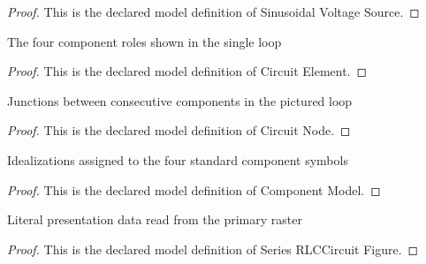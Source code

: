 \begin{proof}
  This is the declared model definition of Sinusoidal Voltage Source.
\end{proof}
\begin{definition}
  \label{def:physics:phyx-mini-0889:phyxminiproblems-problemphyxmini0889-circuitelement}
  The four component roles shown in the single loop
\end{definition}
\begin{proof}
  This is the declared model definition of Circuit Element.
\end{proof}
\begin{definition}
  \label{def:physics:phyx-mini-0889:phyxminiproblems-problemphyxmini0889-circuitnode}
  Junctions between consecutive components in the pictured loop
\end{definition}
\begin{proof}
  This is the declared model definition of Circuit Node.
\end{proof}
\begin{definition}
  \label{def:physics:phyx-mini-0889:phyxminiproblems-problemphyxmini0889-componentmodel}
  Idealizations assigned to the four standard component symbols
\end{definition}
\begin{proof}
  This is the declared model definition of Component Model.
\end{proof}
\begin{definition}
  \label{def:physics:phyx-mini-0889:phyxminiproblems-problemphyxmini0889-seriesrlccircuitfigure}
  Literal presentation data read from the primary raster
\end{definition}
\begin{proof}
  This is the declared model definition of Series RLCCircuit Figure.
\end{proof}
